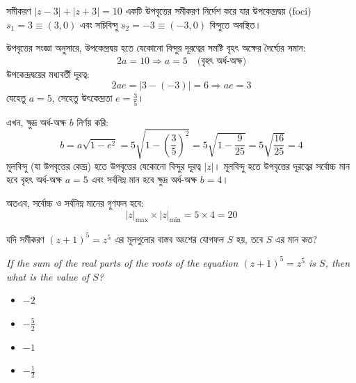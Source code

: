 \documentclass[12pt, a4paper]{article}
\begin{document}
\begin{tcolorbox}[solutionbox={সমাধান (Solution)}]
    \noindent
    সমীকরণ $|z - 3| + |z + 3| = 10$ একটি উপবৃত্তের সমীকরণ নির্দেশ করে যার উপকেন্দ্রদ্বয় (foci) $s_1 = 3 \equiv (3, 0)$ এবং সচিবিন্দু $s_2 = -3 \equiv (-3, 0)$ বিন্দুতে অবস্থিত। 
    
    \vspace{0.5em}
    উপবৃত্তের সংজ্ঞা অনুসারে, উপকেন্দ্রদ্বয় হতে যেকোনো বিন্দুর দূরত্বের সমষ্টি বৃহৎ অক্ষের দৈর্ঘ্যের সমান:
    \[ 2a = 10 \Rightarrow a = 5 \quad \text{(বৃহৎ অর্ধ-অক্ষ)} \]
    উপকেন্দ্রদ্বয়ের মধ্যবর্তী দূরত্ব:
    \[ 2ae = |3 - (-3)| = 6 \Rightarrow ae = 3 \]
    যেহেতু $a = 5$, সেহেতু উৎকেন্দ্রতা $e = \frac{3}{5}$। 
    
    \vspace{0.5em}
    এখন, ক্ষুদ্র অর্ধ-অক্ষ $b$ নির্ণয় করি:
    \[ b = a\sqrt{1 - e^2} = 5\sqrt{1 - \left(\frac{3}{5}\right)^2} = 5\sqrt{1 - \frac{9}{25}} = 5\sqrt{\frac{16}{25}} = 4 \]
    মূলবিন্দু (যা উপবৃত্তের কেন্দ্র) হতে উপবৃত্তের যেকোনো বিন্দুর দূরত্ব $|z|$। মূলবিন্দু হতে উপবৃত্তের দূরত্বের সর্বোচ্চ মান হবে বৃহৎ অর্ধ-অক্ষ $a = 5$ এবং সর্বনিম্ন মান হবে ক্ষুদ্র অর্ধ-অক্ষ $b = 4$। 
    
    \vspace{0.5em}
    অতএব, সর্বোচ্চ ও সর্বনিম্ন মানের গুণফল হবে:
    \[ |z|_{\text{max}} \times |z|_{\text{min}} = 5 \times 4 = 20 \]
\end{tcolorbox}

\vspace{1.5em}

\begin{tcolorbox}[questionbox={প্রশ্ন (Question) 17}]
    \noindent
    যদি সমীকরণ $(z + 1)^5 = z^5$ এর মূলগুলোর বাস্তব অংশের যোগফল $S$ হয়, তবে $S$ এর মান কত?
    
    \vspace{0.8em}
    \begin{english}
    \noindent\textit{\color{darkgray}
    If the sum of the real parts of the roots of the equation $(z + 1)^5 = z^5$ is $S$, then what is the value of $S$?
    }
    \end{english}
\end{tcolorbox}

\begin{itemize}[label={}, leftmargin=1cm, itemsep=0.5em]
    \item[\textbf{A)}] $-2$
    \item[\textbf{B)}] $-\frac{5}{2}$
    \item[\textbf{C)}] $-1$
    \item[\textbf{D)}] $-\frac{1}{2}$
\end{itemize}
\end{document}
